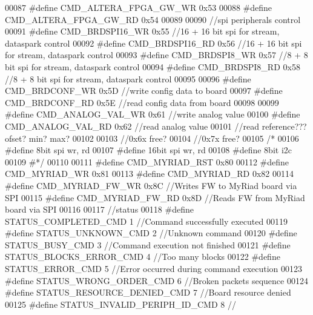 \begin{DoxyCode}
00087 \textcolor{preprocessor}{#define CMD\_ALTERA\_FPGA\_GW\_WR       0x53}
00088 \textcolor{preprocessor}{#define CMD\_ALTERA\_FPGA\_GW\_RD       0x54}
00089 
00090 \textcolor{comment}{//spi peripherals control}
00091 \textcolor{preprocessor}{#define CMD\_BRDSPI16\_WR     0x55 //16 + 16 bit spi for stream, dataspark control}
00092 \textcolor{preprocessor}{#define CMD\_BRDSPI16\_RD     0x56 //16 + 16 bit spi for stream, dataspark control}
00093 \textcolor{preprocessor}{#define CMD\_BRDSPI8\_WR      0x57 //8 + 8 bit spi for stream, dataspark control}
00094 \textcolor{preprocessor}{#define CMD\_BRDSPI8\_RD      0x58 //8 + 8 bit spi for stream, dataspark control}
00095 
00096 \textcolor{preprocessor}{#define CMD\_BRDCONF\_WR      0x5D //write config data to board}
00097 \textcolor{preprocessor}{#define CMD\_BRDCONF\_RD      0x5E //read config data from board}
00098 
00099 \textcolor{preprocessor}{#define CMD\_ANALOG\_VAL\_WR   0x61 //write analog value}
00100 \textcolor{preprocessor}{#define CMD\_ANALOG\_VAL\_RD   0x62 //read analog value}
00101 \textcolor{comment}{//read reference??? ofset? min? max?}
00102 
00103 \textcolor{comment}{//0x6x free?}
00104 \textcolor{comment}{//0x7x free?}
00105 \textcolor{comment}{/*}
00106 \textcolor{comment}{#define 8bit spi wr, rd}
00107 \textcolor{comment}{#define 16bit spi wr, rd}
00108 \textcolor{comment}{#define 8bit i2c}
00109 \textcolor{comment}{#*/}
00110 
00111 \textcolor{preprocessor}{#define CMD\_MYRIAD\_RST      0x80}
00112 \textcolor{preprocessor}{#define CMD\_MYRIAD\_WR       0x81}
00113 \textcolor{preprocessor}{#define CMD\_MYRIAD\_RD       0x82}
00114 \textcolor{preprocessor}{#define CMD\_MYRIAD\_FW\_WR    0x8C //Writes FW to MyRiad board via SPI}
00115 \textcolor{preprocessor}{#define CMD\_MYRIAD\_FW\_RD    0x8D //Reads FW from MyRiad board via SPI}
00116 
00117 \textcolor{comment}{//status}
00118 \textcolor{preprocessor}{#define STATUS\_COMPLETED\_CMD        1 //Command successfully executed}
00119 \textcolor{preprocessor}{#define STATUS\_UNKNOWN\_CMD          2 //Unknown command}
00120 \textcolor{preprocessor}{#define STATUS\_BUSY\_CMD             3 //Command execution not finished}
00121 \textcolor{preprocessor}{#define STATUS\_BLOCKS\_ERROR\_CMD     4 //Too many blocks}
00122 \textcolor{preprocessor}{#define STATUS\_ERROR\_CMD            5 //Error occurred during command execution}
00123 \textcolor{preprocessor}{#define STATUS\_WRONG\_ORDER\_CMD      6 //Broken packets sequence}
00124 \textcolor{preprocessor}{#define STATUS\_RESOURCE\_DENIED\_CMD  7 //Board resource denied}
00125 \textcolor{preprocessor}{#define STATUS\_INVALID\_PERIPH\_ID\_CMD    8 //}

\end{DoxyCode}
